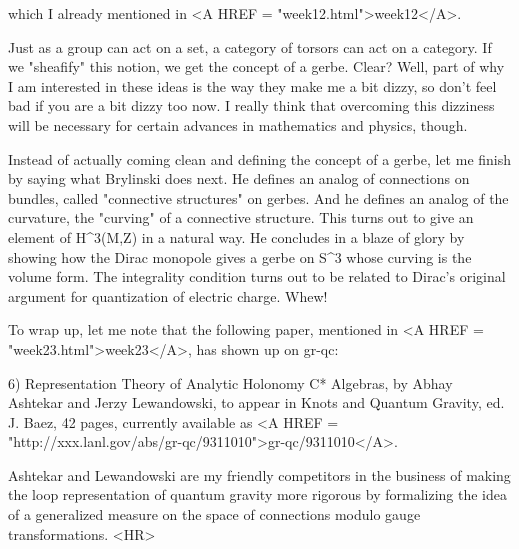 which I already mentioned in <A HREF = "week12.html">week12</A>.  

Just as a group can act on a set, a category of torsors can act on a 
category.  If we "sheafify" this notion, we get the concept of a gerbe.   
Clear?  Well, part of why I am interested in these ideas is the way they 
make me a bit dizzy, so don't feel bad if you are a bit dizzy too now.  
I really think that overcoming this dizziness will be necessary for certain 
advances in mathematics and physics, though.  

Instead of actually coming clean and defining the concept of a gerbe, let
me finish by saying what Brylinski does next.  He defines an analog of
connections on bundles, called "connective structures" on gerbes.  And he
defines an analog of the curvature, the "curving" of a connective
structure.  This turns out to give an element of H^3(M,Z) in a natural
way.   He concludes in a blaze of glory by showing how the Dirac
monopole gives a gerbe on S^3 whose curving is the volume form.  The
integrality condition turns out to be related to Dirac's original
argument for quantization of electric charge.  Whew!   

To wrap up, let me note that the following paper, mentioned in <A HREF = "week23.html">week23</A>,
has shown up on gr-qc:

6) Representation Theory of Analytic Holonomy C* Algebras, by Abhay
Ashtekar and Jerzy Lewandowski, to appear in Knots and Quantum Gravity,
ed. J. Baez, 42 pages, currently available as <A HREF = "http://xxx.lanl.gov/abs/gr-qc/9311010">gr-qc/9311010</A>.  

Ashtekar and Lewandowski are my friendly competitors in the business of
making the loop representation of quantum gravity more rigorous by
formalizing the idea of a generalized measure on the space of
connections modulo gauge transformations.
<HR>



